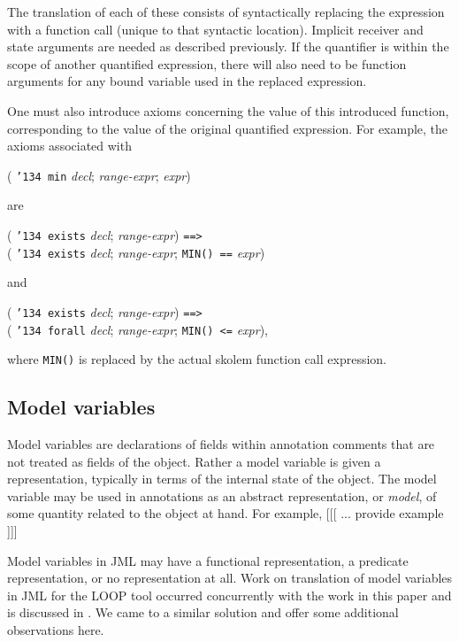 \documentclass{sig-alternate}
\begin{document}
The translation of each of these consists of syntactically replacing the expression with a
function call (unique to that syntactic location).  Implicit receiver and state arguments are needed
as described previously.  If the quantifier is within the scope of another quantified
expression, there will also need to be function arguments for any bound variable used
in the replaced expression.

One must also introduce axioms concerning the value of this introduced function, 
corresponding to the value of the original quantified expression.  For example, the
axioms associated with
\begin{center} ( \texttt{\char'134 min} {\em decl}; {\em range-expr}; {\em expr}) \end{center}
are 
\begin{center} ( \texttt{\char'134 exists} {\em decl}; {\em range-expr}) \texttt{==>} \\
( \texttt{\char'134 exists} {\em decl}; {\em range-expr}; \texttt{MIN() ==} {\em expr}) \end{center}
and
\begin{center} ( \texttt{\char'134 exists} {\em decl}; {\em range-expr}) \texttt{==>} \\
( \texttt{\char'134 forall} {\em decl}; {\em range-expr}; \texttt{MIN() <=} {\em expr}), \end{center}
where \texttt{MIN()} is replaced by the actual skolem function call expression.


\subsection{Model variables}

Model variables are declarations of fields within annotation comments that are not treated
as fields of the object.  Rather a model variable is given a representation, typically in 
terms of the internal state of the object.  The model variable may be used in annotations
as an abstract representation, or {\em model}, of some quantity related to the object at hand.
For example, [[[ ... provide example ]]]

Model variables in JML may have a functional representation, a predicate representation, or 
no representation at all.  Work on translation of model variables in JML for the LOOP tool 
occurred concurrently with the work in this paper and is discussed in 
\cite{BreunessePoll03}.  We came to
a similar solution and offer some additional observations here.
\end{document}
